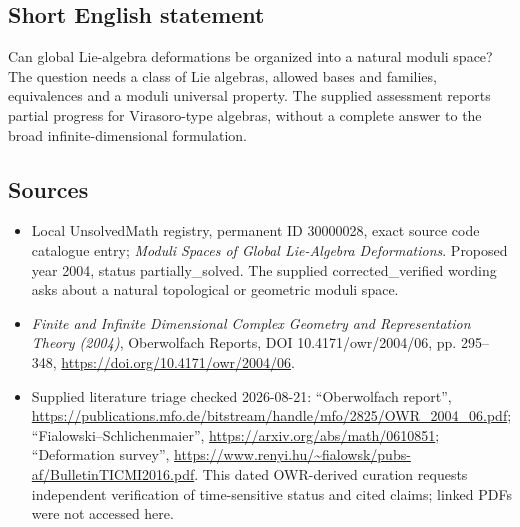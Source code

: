 \documentclass[11pt]{article}
\begin{document}
\subsection{Short English statement}
Can global Lie-algebra deformations be organized into a natural moduli space? The question needs a class of Lie algebras, allowed bases and families, equivalences and a moduli universal property. The supplied assessment reports partial progress for Virasoro-type algebras, without a complete answer to the broad infinite-dimensional formulation.
\subsection{Sources}
\begin{itemize}
\item Local UnsolvedMath registry, permanent ID 30000028, exact source code catalogue entry; \emph{Moduli Spaces of Global Lie-Algebra Deformations}. Proposed year 2004, status partially\_solved. The supplied corrected\_verified wording asks about a natural topological or geometric moduli space.
\item \emph{Finite and Infinite Dimensional Complex Geometry and Representation Theory (2004)}, Oberwolfach Reports, DOI 10.4171/owr/2004/06, pp. 295--348, \url{https://doi.org/10.4171/owr/2004/06}.
\item Supplied literature triage checked 2026-08-21: ``Oberwolfach report'', \url{https://publications.mfo.de/bitstream/handle/mfo/2825/OWR_2004_06.pdf}; ``Fialowski--Schlichenmaier'', \url{https://arxiv.org/abs/math/0610851}; ``Deformation survey'', \url{https://www.renyi.hu/~fialowsk/pubs-af/BulletinTICMI2016.pdf}. This dated OWR-derived curation requests independent verification of time-sensitive status and cited claims; linked PDFs were not accessed here.
\end{itemize}
\end{document}
